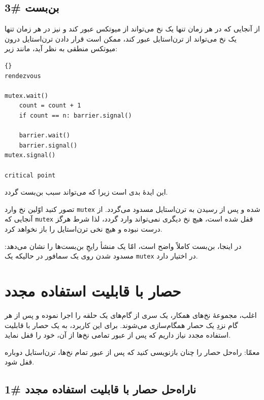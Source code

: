 \documentclass{book}
\newcommand{\clearemptydoublepage}{\newpage\cleardoublepage}
\begin{document}
\clearemptydoublepage
\subsection {بن‌بست \#3}

    از آنجایی که در هر زمان تنها یک نخ می‌تواند از میوتکس عبور کند و نیز در هر زمان تنها یک نخ می‌تواند از ترن‌استایل عبور کند، 
    ممکن است قرار دادن ترن‌استایل درون میوتکس منطقی به نظر آید، مانند زیر: 
\begin{latin}
\begin{lstlisting}[title=\rl{راه حل بدِ حصار}]{}
rendezvous

mutex.wait()
    count = count + 1
    if count == n: barrier.signal()

    barrier.wait()
    barrier.signal()
mutex.signal()

critical point
\end{lstlisting}
\end{latin}

    این ایدهٔ بدی است زیرا که می‌تواند سبب بن‌بست گردد. 

    تصور کنید اوّلین نخ وارد \texttt{mutex} شده و پس از رسیدن به تر‌ن‌استایل مسدود می‌گردد. 
    از آنجایی که \texttt{mutex} قفل شده است، هیچ نخ دیگری نمی‌تواند وارد گردد، لذا شرط 
     هرگز درست نبوده و هیچ نخی ترن‌استایل را باز نخواهد کرد. 

    در اینجا، بن‌بست کاملاً واضح است، امّا یک منشأ رایجِ بن‌بست‌ها را نشان می‌دهد: مسدود شدن روی یک سمافور در حالیکه یک \texttt{mutex} در اختیار دارد. 

\section {حصار با قابلیت استفاده مجدد}
\label{rebar}

    اغلب، مجموعهٔ نخ‌های همکار، یک سری از گام‌های یک حلقه را اجرا نموده و پس از هر گام نزدِ یک حصار همگام‌سازی می‌شوند.
    برای این کاربرد، به یک حصار با قابلیت استفاده مجدد نیاز داریم که پس از عبور تمامی نخ‌ها از آن، خود را قفل نماید.  

    معمّا: راه‌حل حصار را چنان بازنویسی کنید که پس از عبور تمام نخ‌ها، ترن‌استایل دوباره قفل شود.

\clearemptydoublepage
\subsection{ ناراه‌حل حصار با قابلیت استفاده مجدد  \#1}
\end{document}
